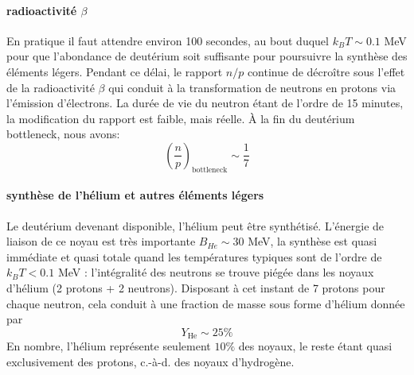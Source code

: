 \paragraph{radioactivité $\beta$} En pratique il faut attendre environ 100 secondes, au bout duquel $k_B T\sim 0.1$ MeV pour que l'abondance de deutérium soit suffisante pour poursuivre la synthèse des éléments légers. Pendant ce délai, le rapport $n/p$ continue de décroître sous l'effet de la radioactivité $\beta$  qui conduit à la transformation de neutrons en protons via l'émission d'électrons. La durée de vie du neutron étant de l'ordre de 15 minutes, la modification du rapport est faible, mais réelle. À la fin du deutérium bottleneck, nous avons:
\begin{equation}
\left(\frac{n}{p}\right)_\mathrm{bottleneck} \sim \frac{1}{7}
\end{equation}

\paragraph{synthèse de l'hélium et autres éléments légers}
Le deutérium devenant disponible, l'hélium peut être synthétisé. L'énergie de liaison de ce noyau est très importante $B_{He}\sim 30$ MeV, la synthèse est quasi immédiate et quasi totale quand les températures typiques sont de l'ordre de $k_B T < 0.1$ MeV : l'intégralité des neutrons se trouve piégée dans les noyaux d'hélium (2 protons + 2 neutrons). Disposant à cet instant de 7 protons pour chaque neutron, cela conduit à une fraction de masse sous forme d'hélium donnée par
\begin{equation}
Y_\mathrm{He}\sim 25\%
\end{equation}
En nombre, l'hélium représente seulement $10\%$ des noyaux, le reste étant quasi exclusivement des protons, c.-à-d. des noyaux d'hydrogène.

